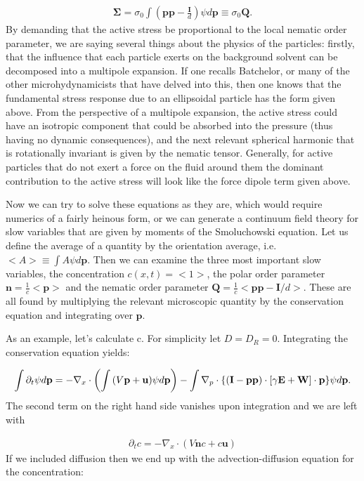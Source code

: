 \documentclass[onecolumn,showpacs,preprintnumbers,prl,amsmath,amssymb]{revtex4-1}
\def\b{\mathbf}
\begin{document}
\begin{gather}
\b{\Sigma}=\sigma_0\int{\left(\b{pp}-\frac{\b{I}}{d}\right)\psi}d\b{p}\equiv\sigma_0\b{Q}.
\end{gather}
By demanding that the active stress be proportional to the local nematic order parameter, we are saying several things about the physics of the particles: firstly, that the influence that each particle exerts on the background solvent can be decomposed into a multipole expansion. If one recalls Batchelor, or many of the other microhydynamicists that have delved into this, then one knows that the fundamental stress response due to an ellipsoidal particle has the form given above. From the perspective of a multipole expansion, the active stress could have an isotropic component that could be absorbed into the pressure (thus having no dynamic consequences), and the next relevant spherical harmonic that is rotationally invariant is given by the nematic tensor. Generally, for active particles that do not exert a force on the fluid around them the dominant contribution to the active stress will look like the force dipole term given above.

Now we can try to solve these equations as they are, which would require numerics of a fairly heinous form, or we can generate a continuum field theory for slow variables that are given by moments of the Smoluchowski equation. Let us define the average of a quantity by the orientation average, i.e. $<A>\equiv\int{A\psi}d\b{p}$. Then we can examine the three most important slow variables, the concentration $c(x,t)=<1>$, the polar order parameter $\b{n}=\frac{1}{c}<\b{p}>$ and the nematic order parameter $\b{Q}=\frac{1}{c}<\b{pp}-\b{I}/d>$. These are all found by multiplying the relevant microscopic quantity by the conservation equation and integrating over $\b{p}$.	

As an example, let's calculate c. For simplicity let $D=D_R=0$. Integrating the conservation equation yields:

\begin{gather}
\int{\partial_t\psi}d\b{p}=-\nabla_x\cdot\left(\int{(V\b{p}+\b{u})\psi}d\b{p}\right)-\int{\nabla_p\cdot\left\{\Huge(\b{I}-\b{pp}\Huge)\cdot\left[\gamma\b{E}+\b{W}\right]\cdot\b{p}\right\}}\psi d\b{p}.
\end{gather}
The second term on the right hand side vanishes upon integration and we are left with 

\begin{gather}
\partial_t c=-\nabla_x\cdot(V\b{n} c+c\b{u})
\end{gather}
If we included diffusion then we end up with the advection-diffusion equation for the concentration:
\end{document}
